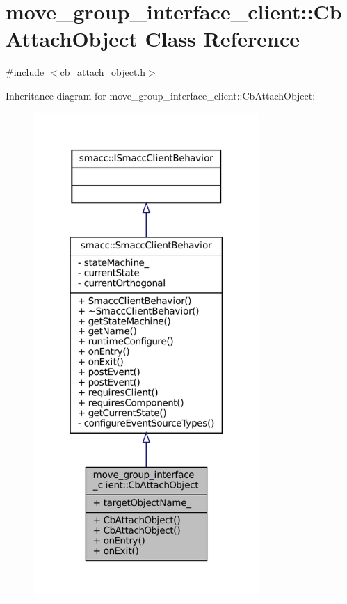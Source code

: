 \hypertarget{classmove__group__interface__client_1_1CbAttachObject}{}\section{move\+\_\+group\+\_\+interface\+\_\+client\+:\+:Cb\+Attach\+Object Class Reference}
\label{classmove__group__interface__client_1_1CbAttachObject}


{\ttfamily \#include $<$cb\+\_\+attach\+\_\+object.\+h$>$}



Inheritance diagram for move\+\_\+group\+\_\+interface\+\_\+client\+:\+:Cb\+Attach\+Object\+:
\nopagebreak
\begin{figure}[H]
\begin{center}
\leavevmode
\includegraphics[width=244pt]{classmove__group__interface__client_1_1CbAttachObject__inherit__graph}
\end{center}
\end{figure}


